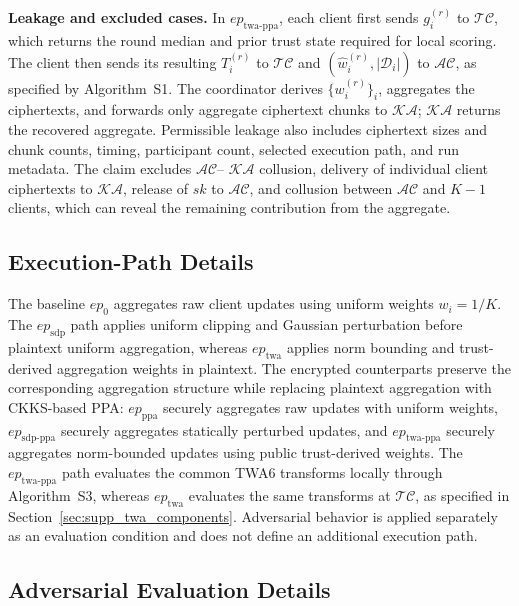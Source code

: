 \documentclass{article}
\begin{document}
\noindent\textbf{Leakage and excluded cases.}
In $ep_{\mathrm{twa\text{-}ppa}}$, each client first sends
$g_i^{(r)}$ to $\mathcal{TC}$, which returns the round median and prior
trust state required for local scoring. The client then sends its resulting
$T_i^{(r)}$ to $\mathcal{TC}$ and
$(\hat w_i^{(r)},|\mathcal D_i|)$ to $\mathcal{AC}$, as specified by
Algorithm~S1. The coordinator derives $\{w_i^{(r)}\}_i$, aggregates the
ciphertexts, and forwards only aggregate ciphertext chunks to $\mathcal{KA}$;
$\mathcal{KA}$ returns the recovered aggregate. Permissible leakage also
includes ciphertext sizes and chunk counts, timing, participant count, selected
execution path, and run metadata. The claim excludes $\mathcal{AC}$--
$\mathcal{KA}$ collusion, delivery of individual client ciphertexts to
$\mathcal{KA}$, release of $sk$ to $\mathcal{AC}$, and collusion between
$\mathcal{AC}$ and $K-1$ clients, which can reveal the remaining contribution
from the aggregate.

\subsection{Execution-Path Details}\label{sec:supp_execution_path_details}

The baseline $ep_{0}$ aggregates raw client updates using uniform weights
$w_i=1/K$. The $ep_{\mathrm{sdp}}$ path applies uniform clipping and
Gaussian perturbation before plaintext uniform aggregation, whereas
$ep_{\mathrm{twa}}$ applies norm bounding and trust-derived aggregation
weights in plaintext. The encrypted counterparts preserve the corresponding
aggregation structure while replacing plaintext aggregation with CKKS-based
PPA: $ep_{\mathrm{ppa}}$ securely aggregates raw updates with
uniform weights, $ep_{\mathrm{sdp\text{-}ppa}}$ securely aggregates
statically perturbed updates, and $ep_{\mathrm{twa\text{-}ppa}}$ securely
aggregates norm-bounded updates using public trust-derived weights. The
$ep_{\mathrm{twa\text{-}ppa}}$ path evaluates the common TWA6 transforms
locally through Algorithm~S3, whereas $ep_{\mathrm{twa}}$ evaluates the same
transforms at $\mathcal{TC}$, as specified in
Section~\ref{sec:supp_twa_components}. Adversarial
behavior is applied separately as an evaluation condition and does not define
an additional execution path.

\subsection{Adversarial Evaluation Details}\label{sec:supp_adversarial_evaluation_details}
\end{document}
